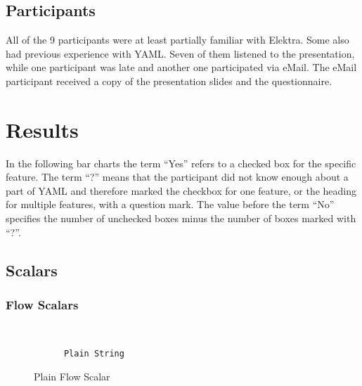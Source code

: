 \documentclass[a4paper, svgnames, 12pt]{article}
\begin{document}
\subsection{Participants}

All of the 9 participants were at least partially familiar with Elektra. Some also had previous experience with YAML. Seven of them listened to the presentation, while one participant was late and another one participated via eMail. The eMail participant received a copy of the presentation slides and the questionnaire.

\section{Results}

In the following bar charts the term “Yes” refers to a checked box for the specific feature. The term “?” means that the participant did not know enough about a part of YAML and therefore marked the checkbox for one feature, or the heading for multiple features, with a question mark. The value before the term “No” specifies the number of unchecked boxes minus the number of boxes marked with “?”.

\subsection{Scalars}

\subsubsection{Flow Scalars}

\begin{figure}[H]
  \begin{minipage}[t]{0.48\textwidth}
    \vspace{0pt}
    \begin{bchart}[max=9, width=0.85\textwidth]
    \end{bchart}
  \end{minipage}
  \begin{minipage}[t]{0pt}~\end{minipage}
  \begin{minipage}[t]{0.48\textwidth}
    \vspace{0pt}
    \begin{verbatim}
      Plain String
    \end{verbatim}
  \end{minipage}
  \caption{Plain Flow Scalar}
\end{figure}
\end{document}
